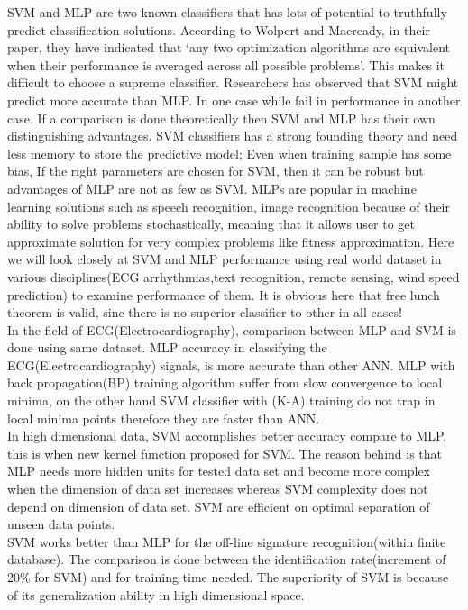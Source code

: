 SVM and MLP are two known classifiers that has lots of potential to truthfully predict classification solutions. According to Wolpert and Macready, in their paper\cite{wolpert1995no}, they have indicated that `any two optimization algorithms are equivalent when their performance is averaged across all possible problems'. This makes it difficult to choose a supreme classifier.  Researchers has observed that SVM might predict more accurate than MLP\cite{Moavenian20103088,Zanaty2012177}. In one case while fail in performance in another case. If a comparison is done theoretically then SVM and MLP has their own distinguishing advantages. SVM classifiers has a strong founding theory and need less memory to store the predictive model; Even when training sample has some bias, If the right parameters are chosen for SVM, then it can be robust\cite{auria2008support} but advantages of MLP are not as few as SVM. MLPs are popular in machine learning solutions such as speech recognition, image recognition because of their ability to solve problems stochastically, meaning that it allows user to get approximate solution for very complex problems like fitness approximation\cite{jin2005neural}. Here we will look closely at SVM and MLP performance using real world dataset in various disciplines(ECG arrhythmias,text recognition, remote sensing, wind speed prediction) to examine performance of them. It is obvious here that free lunch theorem\cite{wolpert1995no} is valid, sine there is no superior classifier to other in all cases!\\
In the field of ECG(Electrocardiography), comparison between MLP and SVM is done using same dataset. MLP accuracy in classifying the ECG(Electrocardiography) signals, is more accurate than other ANN. MLP with back propagation(BP) training algorithm suffer from slow convergence to local minima, on the other hand SVM classifier with (K-A) training do not trap in local minima points therefore they are faster than ANN\cite{Moavenian20103088}.\\
 In high dimensional data, SVM accomplishes better accuracy compare to MLP, this is when new kernel function proposed for SVM. The reason behind is that MLP needs more hidden units for tested data set and become more complex when the dimension of data set increases whereas SVM complexity does not depend on dimension of data set. SVM are efficient on optimal separation of unseen data points\cite{Zanaty2012177}.\\
SVM works better than MLP for the off-line signature recognition(within finite database). The comparison is done between the identification rate(increment of 20\% for SVM) and for training time needed. The superiority of SVM is because of its generalization ability in high dimensional space\cite{FriasMartinez2006693}.\\
